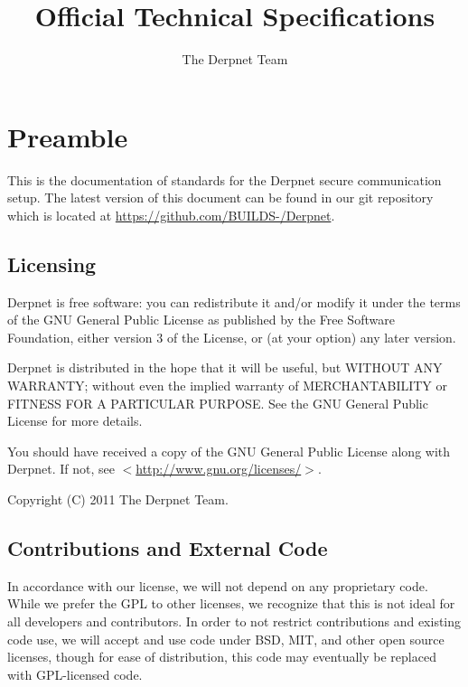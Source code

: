 \documentclass[11pt]{article}
\title{Official Technical Specifications}
\author{The Derpnet Team}
\begin{document}
\maketitle

\section{Preamble}

This is the documentation of standards for the Derpnet secure communication
setup.  The latest version of this document can be found in our git repository
which is located at
\href{https://github.com/BUILDS-/Derpnet}{https://github.com/BUILDS-/Derpnet}.

\subsection{Licensing}


Derpnet is free software: you can redistribute it and/or modify it under the
terms of the GNU General Public License as published by the Free Software
Foundation, either version 3 of the License, or (at your option) any later
version.

Derpnet is distributed in the hope that it will be useful, but WITHOUT ANY
WARRANTY; without even the implied warranty of MERCHANTABILITY or FITNESS FOR
A PARTICULAR PURPOSE.  See the GNU General Public License for more details.

You should have received a copy of the GNU General Public License along with
Derpnet.  If not, see $<$\href{http://www.gnu.org/licenses/}{http://www.gnu.org/licenses/}$>$.
 
Copyright (C) 2011 The Derpnet Team.

\subsection{Contributions and External Code}

In accordance with our license, we will not depend on any proprietary code.
While we prefer the GPL to other licenses, we recognize that this is not ideal
for all developers and contributors.  In order to not restrict contributions
and existing code use, we will accept and use code under BSD, MIT, and other
open source licenses, though for ease of distribution, this code may
eventually be replaced with GPL-licensed code.
\end{document}
